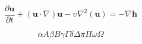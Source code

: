 \documentclass[10pt, a4paper]{article}
\begin{document}
    \begin{equation}
        \frac{\partial{\textbf{u}}}{\partial{t}} + (\textbf{u} \cdot \nabla)\mathbf{\textbf{u}} - \upsilon \nabla^2 (\mathbf{\textbf{u}}) = -\nabla \mathbf{\textbf{h}}
    \end{equation}
    
    \begin{equation}
        \alpha A \beta B \gamma \Gamma \delta \Delta \pi \Pi \omega \Omega
    \end{equation}
\end{document}
